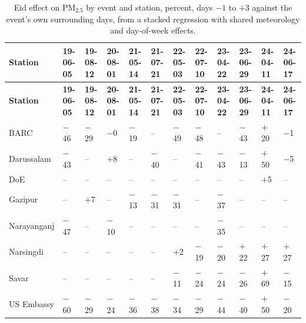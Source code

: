 \begingroup\scriptsize
\begin{longtable}{L{2.0cm} C{1.0cm} C{1.0cm} C{1.0cm} C{1.0cm} C{1.0cm} C{1.0cm} C{1.0cm} C{1.0cm} C{1.0cm} C{1.0cm} C{1.0cm}}
\caption{Eid effect on PM$_{2.5}$ by event and station, percent, days $-1$ to $+3$ against the event's own surrounding days, from a stacked regression with shared meteorology and day-of-week effects.}\label{tab:s-eid}\\
\toprule
\textbf{Station} & \textbf{19-06-05} & \textbf{19-08-12} & \textbf{20-08-01} & \textbf{21-05-14} & \textbf{21-07-21} & \textbf{22-05-03} & \textbf{22-07-10} & \textbf{23-04-22} & \textbf{23-06-29} & \textbf{24-04-11} & \textbf{24-06-17} \\
\midrule\endfirsthead
\toprule
\textbf{Station} & \textbf{19-06-05} & \textbf{19-08-12} & \textbf{20-08-01} & \textbf{21-05-14} & \textbf{21-07-21} & \textbf{22-05-03} & \textbf{22-07-10} & \textbf{23-04-22} & \textbf{23-06-29} & \textbf{24-04-11} & \textbf{24-06-17} \\
\midrule\endhead
\bottomrule\endfoot
BARC & $-$46 & $-$29 & $-$0 & $-$19 & -- & $-$49 & $-$48 & -- & $-$43 & $+$20 & $-$1 \\
Darussalam & $-$43 & -- & $+$8 & -- & $-$40 & -- & $-$41 & $-$43 & $-$13 & $+$50 & $-$5 \\
DoE & -- & -- & -- & -- & -- & -- & -- & -- & -- & $+$5 & -- \\
Gazipur & -- & $+$7 & -- & $-$13 & $-$31 & $-$31 & -- & $-$37 & -- & -- & -- \\
Narayanganj & $-$47 & -- & $-$10 & -- & -- & -- & -- & $-$35 & -- & -- & -- \\
Narsingdi & -- & -- & -- & -- & -- & $+$2 & $-$19 & $-$20 & $+$22 & $+$27 & $+$27 \\
Savar & -- & -- & -- & -- & -- & $-$11 & $-$24 & $-$24 & $-$26 & $+$69 & $-$15 \\
US Embassy & $-$60 & $-$29 & $-$24 & $-$36 & $-$38 & $-$34 & $-$29 & $-$44 & $-$40 & $+$50 & $-$20 \\
\end{longtable}
\endgroup
